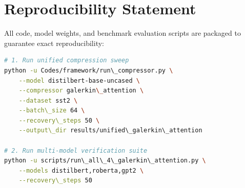 \section{Reproducibility Statement}
All code, model weights, and benchmark evaluation scripts are packaged to guarantee exact reproducibility:
\begin{lstlisting}[language=bash]
# 1. Run unified compression sweep
python -u Codes/framework/run\_compressor.py \
    --model distilbert-base-uncased \
    --compressor galerkin\_attention \
    --dataset sst2 \
    --batch\_size 64 \
    --recovery\_steps 50 \
    --output\_dir results/unified\_galerkin\_attention

# 2. Run multi-model verification suite
python -u scripts/run\_all\_4\_galerkin\_attention.py \
    --models distilbert,roberta,gpt2 \
    --recovery\_steps 50
\end{lstlisting}

